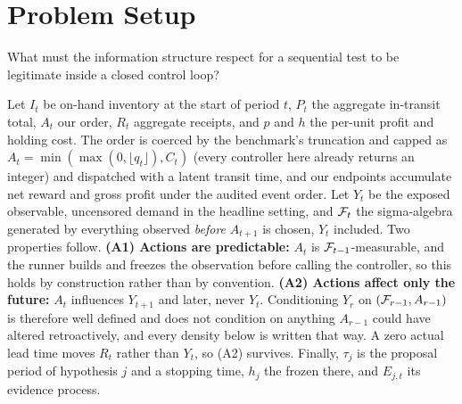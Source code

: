 \section{Problem Setup}
\label{sec:setup}

What must the information structure respect for a sequential test to be
legitimate inside a closed control loop?

Let $I_t$ be on-hand inventory at the start of period $t$, $P_t$ the aggregate
in-transit total, $A_t$ our order, $R_t$ aggregate receipts, and $p$ and $h$ the
per-unit profit and holding cost. The order is coerced by the benchmark's truncation
and capped as $A_t = \min(\max(0, \lfloor q_t \rfloor), C_t)$ (every controller
here already returns an integer) and dispatched with a latent transit time, and our
endpoints accumulate net reward and gross profit under the audited event order. Let $Y_t$ be the exposed observable,
uncensored demand in the headline setting, and $\mathcal{F}_t$ the sigma-algebra
generated by everything observed \emph{before} $A_{t+1}$ is chosen, $Y_t$
included. Two properties follow. \textbf{(A1) Actions are
predictable:} $A_t$ is $\mathcal{F}_{t-1}$-measurable, and the runner builds and freezes
the observation before calling the controller, so this holds by construction
rather than by convention. \textbf{(A2) Actions affect only the future:} $A_t$
influences $Y_{t+1}$ and later, never $Y_t$. Conditioning $Y_r$ on
$(\mathcal{F}_{r-1}, A_{r-1})$ is therefore well defined and does not condition on
anything $A_{r-1}$ could have altered retroactively, and every density below is
written that way. A zero actual lead time moves $R_t$ rather than $Y_t$, so (A2)
survives. Finally, $\tau_j$ is the proposal period of hypothesis $j$ and a
stopping time, $h_j$ the \shockspec{} frozen there, and $E_{j,t}$ its evidence
process.
